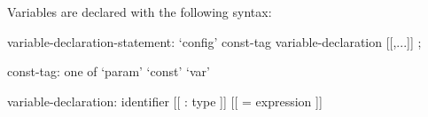 Variables are declared with the following syntax:
\begin{syntax}
variable-declaration-statement:
  `config' const-tag variable-declaration [[,...]] ;

const-tag: one of
  `param' `const' `var'

variable-declaration:
  identifier [[ : type ]] [[ = expression ]]
\end{syntax}
